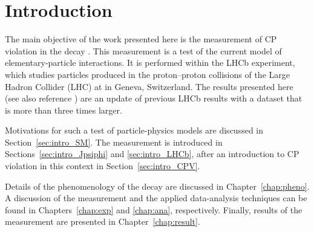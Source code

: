 \chapter{Introduction}
\label{chap:intro}

The main objective of the work presented here is the measurement of CP violation in the decay \BstoJpsiphi. This measurement is a test of
the current model of elementary-particle interactions. It is performed within the LHCb experiment, which studies particles produced in the
proton--proton collisions of the Large Hadron Collider (LHC) at \cern{} in Geneva, Switzerland. The results presented here (see also
reference \cite{LHCb-PAPER-2014}) are an update of previous LHCb results \cite{LHCb-PAPER-2013-002} with a dataset that is more than three
times larger.

Motivations for such a test of particle-physics models are discussed in Section~\ref{sec:intro_SM}. The measurement is introduced in
Sections~\ref{sec:intro_Jpsiphi} and \ref{sec:intro_LHCb}, after an introduction to CP violation in this context in
Section~\ref{sec:intro_CPV}.

Details of the phenomenology of the \BstoJpsiphi{} decay are discussed in Chapter~\ref{chap:pheno}. A discussion of the  measurement and
the applied data-analysis techniques can be found in Chapters~\ref{chap:exp} and \ref{chap:ana}, respectively. Finally, results of the
measurement are presented in Chapter~\ref{chap:result}.






